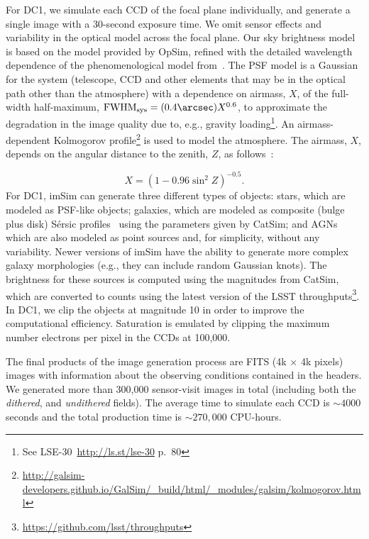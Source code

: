 \documentclass[\docopts]{\docclass}
\begin{document}
For DC1, we simulate each CCD of the focal plane individually, and generate a single image with a 30-second exposure time. We omit sensor effects and variability in the optical model across the focal plane. Our sky brightness model is based on the \citet{1991PASP..103.1033K} model provided by OpSim, refined with the detailed wavelength dependence of the phenomenological model from~\citet{2016SPIE.9910E..1AY}. The PSF model is a Gaussian for the system (telescope, CCD and other elements that may be in the optical path other than the atmosphere) with a  dependence on airmass, $X$, of the full-width half-maximum, $\mathrm{FWHM_{sys}} = (0.4\arcsec) X^{0.6}$, to approximate the degradation in the image quality due to, e.g., gravity loading\footnote{See LSE-30~\url{http://ls.st/lse-30} p.~80}. An airmass-dependent Kolmogorov profile\footnote{\url{http://galsim-developers.github.io/GalSim/_build/html/_modules/galsim/kolmogorov.html}} is used to model the atmosphere. The airmass, $X$, depends on the angular distance to the zenith, $Z$, as follows~\citep{1991PASP..103.1033K}:

\begin{equation}
X = (1 - 0.96\sin^{2}{Z})^{-0.5}.
\end{equation}
For DC1, imSim can generate three different types of objects: stars, which are modeled as PSF-like objects; galaxies, which are modeled as composite (bulge plus disk) S\'{e}rsic profiles~\citep{1963BAAA....6...41S} using
the parameters given by CatSim; and AGNs which are also modeled as point sources and, for simplicity, without any variability. Newer versions of imSim have the ability to generate more complex galaxy morphologies (e.g., they can include random Gaussian knots). The brightness for these sources is computed using the magnitudes from CatSim, which are converted to counts using the latest version of the LSST throughputs\footnote{\url{https://github.com/lsst/throughputs}}. In DC1, we clip the objects at magnitude 10 in order to improve the computational efficiency. Saturation is emulated by clipping the maximum number electrons per pixel in the CCDs at 100,000.

The final products of the image generation process are FITS (4k $\times$ 4k pixels) images with information about the observing conditions contained in the headers. We generated more than 300,000 sensor-visit images in total (including both the \textit{dithered}, and \textit{undithered} fields). The average time to simulate each CCD is $\sim 4000$ seconds and the total production time is $\sim 270,000$ CPU-hours.
\end{document}
